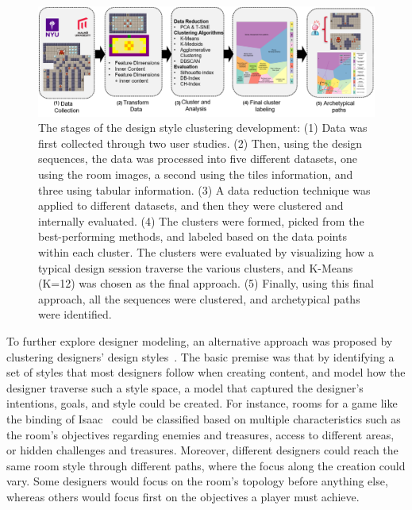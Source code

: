 \begin{figure}
\centerline{\includegraphics[width=\textwidth]{figures/DesPersonas-figs/process-steps.png}}
\caption{The stages of the design style clustering development: (1) Data was first collected through two user studies. (2) Then, using the design sequences, the data was processed into five different datasets, one using the room images, a second using the tiles information, and three using tabular information. (3) A data reduction technique was applied to different datasets, and then they were clustered and internally evaluated. (4) The clusters were formed, picked from the best-performing methods, and labeled based on the data points within each cluster. The clusters were evaluated by visualizing how a typical design session traverse the various clusters, and K-Means (K=12) was chosen as the final approach. (5) Finally, using this final approach, all the sequences were clustered, and archetypical paths were identified.
} \label{fig:clusteringApproach}
\end{figure}

To further explore designer modeling, an alternative approach was proposed by clustering designers' design styles~\cite{alvarez2020-designerpersonas}. The basic premise was that by identifying a set of styles that most designers follow when creating content, and model how the designer traverse such a style space, a model that captured the designer's intentions, goals, and style could be created. For instance, rooms for a game like the binding of Isaac~\cite{bindingISAAC} could be classified based on multiple characteristics such as the room's objectives regarding enemies and treasures, access to different areas, or hidden challenges and treasures. Moreover, different designers could reach the same room style through different paths, where the focus along the creation could vary. Some designers would focus on the room's topology before anything else, whereas others would focus first on the objectives a player must achieve. 

